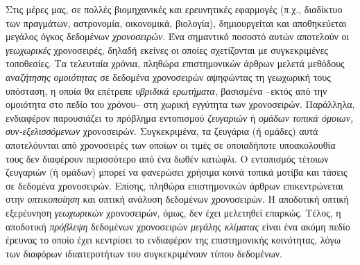 Στις μέρες μας, σε πολλές βιομηχανικές και ερευνητικές εφαρμογές (π.χ., διαδίκτυο των πραγμάτων, αστρονομία, οικονομικά, βιολογία), δημιουργείται και αποθηκεύεται μεγάλος όγκος δεδομένων \textit{χρονοσειρών}. Ένα σημαντικό ποσοστό αυτών αποτελούν οι \textit{γεωχωρικές} χρονοσειρές, δηλαδή εκείνες οι οποίες σχετίζονται με συγκεκριμένες τοποθεσίες. Τα τελευταία χρόνια, πληθώρα επιστημονικών άρθρων μελετά μεθόδους \textit{αναζήτησης ομοιότητας} σε δεδομένα χρονοσειρών αψηφώντας τη γεωχωρική τους υπόσταση, η οποία θα επέτρεπε \textit{υβριδικά ερωτήματα}, βασισμένα --εκτός από την ομοιότητα στο πεδίο του χρόνου-- στη χωρική εγγύτητα των χρονοσειρών. Παράλληλα, ενδιαφέρον παρουσιάζει το πρόβλημα εντοπισμού \textit{ζευγαριών} ή \textit{ομάδων τοπικά όμοιων, συν-εξελισσόμενων} χρονοσειρών. Συγκεκριμένα, τα ζευγάρια (ή ομάδες) αυτά αποτελόυνται από χρονοσειρές των οποίων οι τιμές σε οποιαδήποτε υποακολουθία τους δεν διαφέρουν περισσότερο από ένα δωθέν κατώφλι. Ο εντοπισμός τέτοιων ζευγαριών (ή ομάδων) μπορεί να φανερώσει χρήσιμα κοινά τοπικά μοτίβα και τάσεις σε δεδομένα χρονοσειρών. Επίσης, πληθώρα επιστημονικών άρθρων επικεντρώνεται στην \textit{οπτικοποίηση} και οπτική ανάλυση δεδομένων χρονοσειρών. Η αποδοτική οπτική εξερέυνηση \textit{γεωχωρικών} χρονοσειρών, όμως, δεν έχει μελετηθεί επαρκώς. Τέλος, η αποδοτική \textit{πρόβλεψη} δεδομένων χρονοσειρών \textit{μεγάλης κλίματας} είναι ένα ακόμη πεδίο έρευνας το οποίο έχει κεντρίσει το ενδιαφέρον της επιστημονικής κοινότητας, λόγω των διαφόρων ιδιαιτεροτήτων του συγκεκριμένουν τύπου δεδομένων.

